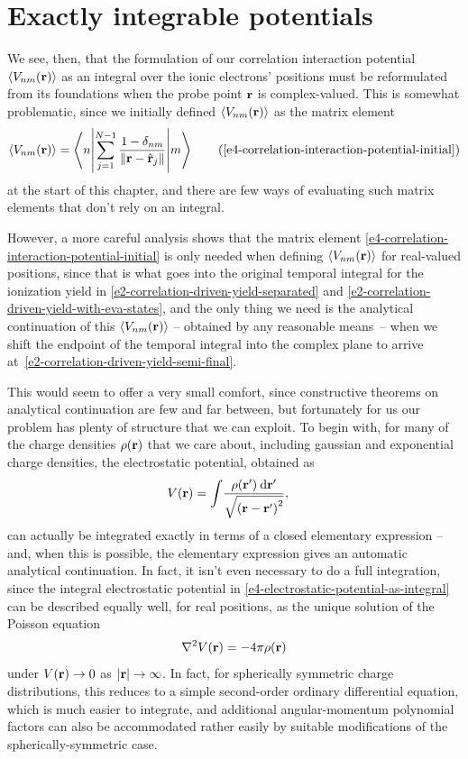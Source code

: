 \section{Exactly integrable potentials}
We see, then, that the formulation of our correlation interaction potential $\left\langle V_{nm}\mathopen{}\left( \vb{r} \right)\mathclose{} \right\rangle$ as an integral over the ionic electrons' positions must be reformulated from its foundations when the probe point $\vb{r}$ is complex-valued. This is somewhat problematic, since we initially defined $\left\langle V_{nm}\mathopen{}\left( \vb{r} \right)\mathclose{} \right\rangle$ as the matrix element 
\begin{equation}
\Vnm{\vbr}=\matrixel**{n}{\sum_{j=1}^{N-1} \frac{1-\delta_{nm}}{\| \vbr - \hat{\vbr}_j\|} }{m}
\backtag{e4-correlation-interaction-potential-initial}
\end{equation}
at the start of this chapter, and there are few ways of evaluating such matrix elements that don't rely on an integral. 

However, a more careful analysis shows that the matrix element \eqref{e4-correlation-interaction-potential-initial} is only needed when defining $\left\langle V_{nm}\mathopen{}\left( \vb{r} \right)\mathclose{} \right\rangle$ for real-valued positions, since that is what goes into the original temporal integral for the ionization yield in \eqref{e2-correlation-driven-yield-separated} and \eqref{e2-correlation-driven-yield-with-eva-states}, and the only thing we need is the analytical continuation of this $\left\langle V_{nm}\mathopen{}\left( \vb{r} \right)\mathclose{} \right\rangle$ -- obtained by any reasonable means~-- when we shift the endpoint of the temporal integral into the complex plane to arrive at~\eqref{e2-correlation-driven-yield-semi-final}. 


This would seem to offer a very small comfort, since constructive theorems on analytical continuation are few and far between, but fortunately for us our problem has plenty of structure that we can exploit. To begin with, for many of the charge densities $\rho(\vb{r})$ that we care about, including gaussian and exponential charge densities, the electrostatic potential, obtained as
\begin{align}
V(\vb{r})
& =
\int\!
\frac{
  \rho(\vb{r}') \:\mathrm{d}\vb{r}'
  }{
  \sqrt{ \left( \vb{r}-\vb{r}' \right)^2}
  }
,
\label{e4-electrostatic-potential-as-integral}
\end{align}
can actually be integrated exactly in terms of a closed elementary expression -- and, when this is possible, the elementary expression gives an automatic analytical continuation. In fact, it isn't even necessary to do a full integration, since the integral electrostatic potential in \eqref{e4-electrostatic-potential-as-integral} can  be described equally well, for real positions, as the unique solution of the Poisson equation
\begin{equation}
\nabla^2 V(\vb{r})=-4\pi \rho(\vb{r})
\label{e4-poisson-equation}
\end{equation}
under $V(\vb{r})\to 0$ as $|\vb{r}|\to\infty$. In fact, for spherically symmetric charge distributions, this reduces to a simple second-order ordinary differential equation, which is much easier to integrate, and additional angular-momentum polynomial factors can also be accommodated rather easily by suitable modifications of the spherically-symmetric case.

